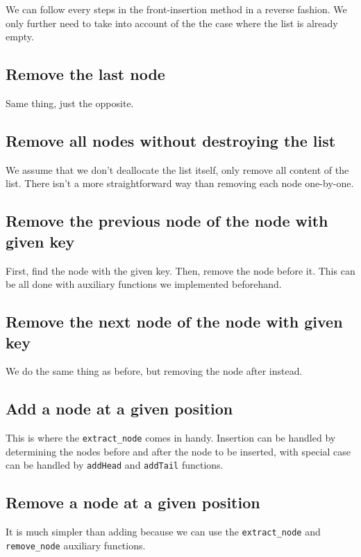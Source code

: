\documentclass{article}
\begin{document}
We can follow every steps in the front-insertion method in a reverse fashion. We only further need to take into account of the the case where the list is already empty.


\subsection{Remove the last node}

Same thing, just the opposite.


\subsection{Remove all nodes without destroying the list}

We assume that we don't deallocate the list itself, only remove all content of the list. There isn't a more straightforward way than removing each node one-by-one.


\subsection{Remove the previous node of the node with given key}

First, find the node with the given key. Then, remove the node before it. This can be all done with auxiliary functions we implemented beforehand.


\subsection{Remove the next node of the node with given key}

We do the same thing as before, but removing the node after instead.


\subsection{Add a node at a given position}

This is where the \lstinline{extract_node} comes in handy. Insertion can be handled by determining the nodes before and after the node to be inserted, with special case can be handled by \lstinline{addHead} and \lstinline{addTail} functions.


\subsection{Remove a node at a given position}

It is much simpler than adding because we can use the \lstinline{extract_node} and \lstinline{remove_node} auxiliary functions.
\end{document}

